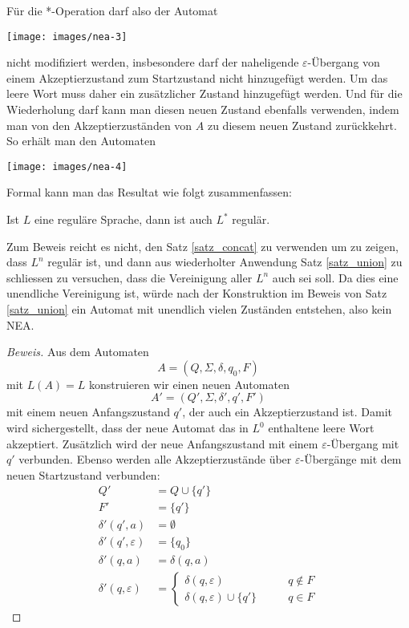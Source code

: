 Für die *-Operation darf also der Automat
\begin{center}
\texttt{[image: images/nea-3]}
\end{center}
nicht modifiziert werden, insbesondere darf der naheligende
$\varepsilon$-Übergang von einem Akzeptierzustand zum Startzustand
nicht hinzugefügt werden.
Um das leere Wort muss daher ein zusätzlicher Zustand hinzugefügt werden.
Und für die Wiederholung darf kann man diesen neuen Zustand ebenfalls
verwenden, indem man von den Akzeptierzuständen von $A$ zu diesem
neuen Zustand zurückkehrt.
So erhält man den Automaten
\begin{center}
\texttt{[image: images/nea-4]}
\end{center}

Formal kann man das Resultat wie folgt zusammenfassen:
\begin{satz}
\label{satz_star}
Ist $L$ eine reguläre Sprache, dann ist auch $L^*$ regulär.
\end{satz}

Zum Beweis reicht es nicht, den Satz \ref{satz_concat} zu verwenden
um zu zeigen, dass $L^n$ regulär ist, und dann aus wiederholter
Anwendung Satz \ref{satz_union} zu schliessen zu versuchen,
dass die Vereinigung aller $L^n$ auch sei soll.
Da dies eine unendliche
Vereinigung ist, würde nach der Konstruktion im Beweis von Satz
\ref{satz_union} ein Automat mit unendlich vielen
Zuständen entstehen, also kein NEA.

\begin{proof}[Beweis]
Aus dem Automaten
\[
A=(Q,\Sigma, \delta,q_0,F)
\]
mit $L(A)=L$ konstruieren wir einen neuen
Automaten
\[
A'=(Q',\Sigma,\delta',q',F')
\]
mit einem neuen Anfangszustand $q'$, der auch
ein Akzeptierzustand ist.
Damit wird sichergestellt, dass der neue Automat das in $L^0$
enthaltene leere Wort akzeptiert.
Zusätzlich wird der neue Anfangszustand mit einem $\varepsilon$-Übergang
mit $q'$ verbunden.
Ebenso werden alle Akzeptierzustände über $\varepsilon$-Übergänge
mit dem neuen Startzustand verbunden:
\begin{align*}
Q'&=Q\cup \{q'\}\\
F'&=\{q'\}\\
\delta'(q',a)&=\emptyset\\
\delta'(q',\varepsilon)&= \{q_0\}\\
\delta'(q,a)&= \delta(q,a)\\
\delta'(q,\varepsilon)&=\begin{cases}
\delta(q,\varepsilon)          &\qquad q\not\in F\\
\delta(q,\varepsilon)\cup\{q'\}&\qquad q\in F
\end{cases}
\end{align*}
\end{proof}
